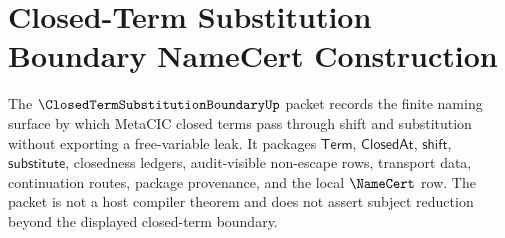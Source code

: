 \chapter{Closed-Term Substitution Boundary NameCert Construction}
\label{ch:concrete-instances-closedtermsubstitutionboundary-namecert}

The $\ClosedTermSubstitutionBoundaryUp$ packet records the finite naming surface by which MetaCIC closed terms pass through shift and substitution without exporting a free-variable leak. It packages $\mathsf{Term}$, $\mathsf{ClosedAt}$, $\mathsf{shift}$, $\mathsf{substitute}$, closedness ledgers, audit-visible non-escape rows, transport data, continuation routes, package provenance, and the local $\NameCert$ row. The packet is not a host compiler theorem and does not assert subject reduction beyond the displayed closed-term boundary.

